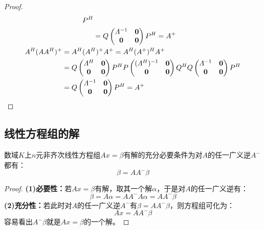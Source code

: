 \begin{proof}
\begin{gather*}
\begin{aligned}
			P^H \\
			&=Q
			\begin{pmatrix}
				\varLambda^{-1} & \mathbf{0} \\
				\mathbf{0} & \mathbf{0}
			\end{pmatrix}
			P^H=A^+
		\end{aligned} \\
		\begin{aligned}
			A^H(AA^H)^+
			&=A^H(A^H)^+A^+
			=A^H(A^+)^HA^+ \\
			&=Q
			\begin{pmatrix}
				\varLambda^H & \mathbf{0} \\
				\mathbf{0} & \mathbf{0}
			\end{pmatrix}
			P^HP
			\begin{pmatrix}
				(\varLambda^H)^{-1} & \mathbf{0} \\
				\mathbf{0} & \mathbf{0}
			\end{pmatrix}
			Q^HQ
			\begin{pmatrix}
				\varLambda^{-1} & \mathbf{0} \\
				\mathbf{0} & \mathbf{0}
			\end{pmatrix}
			P^H \\
			&=Q
			\begin{pmatrix}
				\varLambda^{-1} & \mathbf{0} \\
				\mathbf{0} & \mathbf{0}
			\end{pmatrix}
			P^H=A^+
		\end{aligned}\qedhere
	\end{gather*}
\end{proof}

\subsection{线性方程组的解}
\begin{theorem}\label{theo:ConsistentLinearEqCondition}
	数域$K$上$n$元非齐次线性方程组$Ax=\beta$有解的充分必要条件为对$A$的任一广义逆$A^-$都有：
	\begin{equation*}
		\beta=AA^-\beta
	\end{equation*}
\end{theorem}
\begin{proof}
	\textbf{(1)必要性：}若$Ax=\beta$有解，取其一个解$\alpha$，于是对$A$的任一广义逆有：
	\begin{equation*}
		\beta=A\alpha=AA^-A\alpha=AA^-\beta
	\end{equation*}
	\textbf{(2)充分性：}若此时对$A$的任一广义逆$A^-$有$\beta=AA^-\beta$，则方程组可化为：
	\begin{equation*}
		Ax=AA^-\beta
	\end{equation*}
	容易看出$A^-\beta$就是$Ax=\beta$的一个解。
\end{proof}
